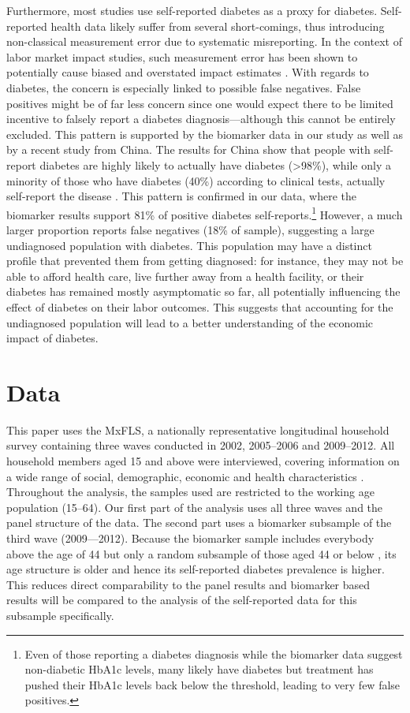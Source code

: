 \documentclass[12pt,english]{article}
\begin{document}
Furthermore, most studies use self-reported diabetes as a proxy for diabetes. Self-reported health data likely suffer from  several short-comings, thus introducing non-classical measurement error due to systematic misreporting. In the context of labor market impact studies, such measurement error has been shown to potentially cause biased and overstated impact estimates \parencite{Cawley2015,ONeill2013,Perks2015}. With regards to diabetes, the concern is especially linked to possible false negatives. False positives might be of far less concern since one would expect there to be limited incentive to falsely report a diabetes diagnosis---although this cannot be entirely excluded. This pattern is supported by the biomarker data in our study as well as by a recent study from China. The results for China show that people with self-report diabetes are highly likely to actually have diabetes (>98\%), while only a minority of those who have diabetes (40\%) according to clinical tests, actually self-report the disease \parencite{Yuan2015}. This pattern is confirmed in our data, where the biomarker results support 81\% of positive diabetes self-reports.\footnote{Even of those reporting a diabetes diagnosis while the biomarker data suggest non-diabetic \ac{HbA1c} levels, many likely have diabetes but treatment has pushed their \ac{HbA1c} levels back below the threshold, leading to very few false positives.}  However, a much larger proportion reports false negatives (18\% of sample), suggesting a large undiagnosed population with diabetes. This population may have a distinct profile that prevented them from getting diagnosed: for instance, they may not be able to afford health care, live further away from a health facility,  or their diabetes has remained mostly asymptomatic so far, all potentially influencing the effect of diabetes on their labor outcomes. This suggests that accounting for the undiagnosed population will lead to a better understanding of the economic impact of diabetes.



\section{\label{sec:Data}Data}

This paper uses the \acf{MxFLS}, a nationally representative longitudinal household survey containing three waves conducted in 2002, 2005--2006 and 2009--2012. All household members aged 15 and above were interviewed, covering information on a wide range of social, demographic, economic and health characteristics \parencite{Rubalcava2013}. Throughout the analysis, the samples used are restricted to the working age population (15--64). Our first part of the analysis uses all three waves and the panel structure of the data. The second part uses a biomarker subsample of the third wave (2009---2012). Because the biomarker sample includes everybody above the age of 44 but only a random subsample of those aged 44 or below \parencite{Crimmins2015}, its age structure is older and hence its self-reported diabetes prevalence is higher. This reduces direct comparability to the panel results and biomarker based results will be compared to the analysis of the self-reported data for this subsample specifically.
\end{document}
